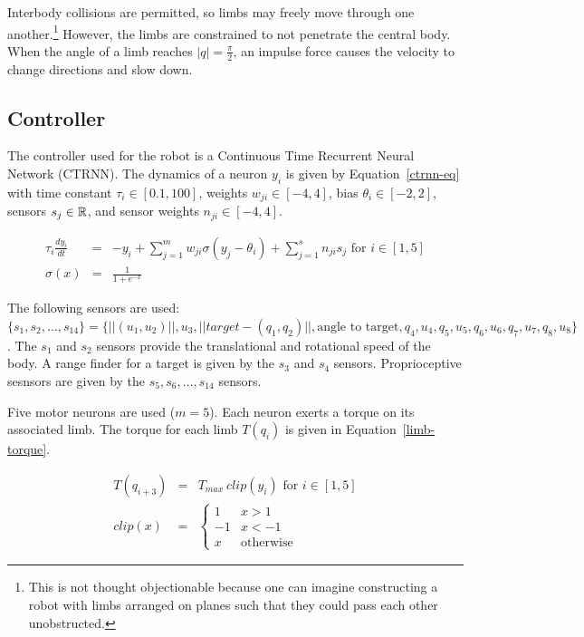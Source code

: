Interbody collisions are permitted, so limbs may freely move through
one another.\footnote{This is not thought objectionable because one
  can imagine constructing a robot with limbs arranged on planes such
  that they could pass each other unobstructed.}  However, the limbs
are constrained to not penetrate the central body.  When the angle of
a limb reaches $|q| = \frac{\pi}{2}$, an impulse force causes the
velocity to change directions and slow down.


\subsection{Controller}

The controller used for the robot is a Continuous Time Recurrent
Neural Network (CTRNN).  The dynamics of a neuron $y_i$ is given by
Equation~\ref{ctrnn-eq} with time constant $\tau_i \in [0.1, 100]$,
weights $w_{ji} \in [-4, 4]$, bias $\theta_i \in [-2, 2]$, sensors
$s_j \in \mathbb{R} $, and sensor weights $n_{ji} \in [-4, 4]$.

\begin{eqnarray}
  \tau_i \frac{d y_i}{dt} &=& -y_i + \sum_{j = 1}^m w_{ji} \sigma(y_j - \theta_i) + \sum_{j=1}^s n_{ji} s_j \text{ for } i \in [1,5] \label{ctrnn-eq} \\
  \sigma(x) &=& \frac{1}{1 + e^{-x}}
\end{eqnarray}

The following sensors are used: $\{s_1, s_2, \ldots, s_{14}\} =
\{||(u_1, u_2)||, u_3, ||target - (q_1, q_2)||, \text{angle to
  target}, q_4, u_4, q_5, u_5, q_6, u_6, q_7, u_7, q_8, u_8\}$.  The
$s_1$ and $s_2$ sensors provide the translational and rotational speed
of the body.  A range finder for a target is given by the $s_3$ and
$s_4$ sensors.  Proprioceptive sesnsors are given by the $s_5, s_6,
\ldots, s_{14}$ sensors.

Five motor neurons are used ($m = 5$).  Each neuron exerts a torque on
its associated limb.  The torque for each limb $T(q_i)$ is given in
Equation~\ref{limb-torque}.

\begin{eqnarray}
  T(q_{i + 3}) &=& T_{max}~clip(y_i) \text{ for } i \in [1,5] \label{limb-torque} \\
  clip(x) &=& \begin{cases}
              1 & x > 1 \\
              -1 & x < -1 \\
              x & \text{otherwise} 
              \end{cases}
\end{eqnarray}

